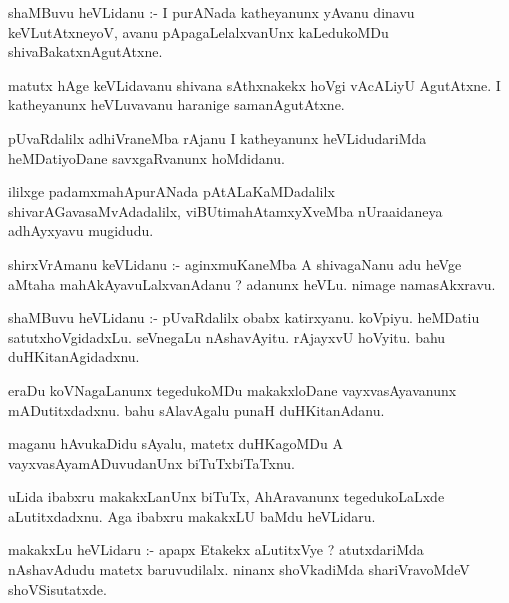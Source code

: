 \documentclass{article}
\begin{document}
\begin{mn}
shaMBuvu  heVLidanu :- I  purANada  katheyanunx  yAvanu  dinavu  keVLutAtxneyoV,  avanu  pApagaLelalxvanUnx  
kaLedukoMDu  shivaBakatxnAgutAtxne.
\end{mn}

\begin{mn}
matutx  hAge  keVLidavanu  shivana  sAthxnakekx  hoVgi  vAcALiyU  AgutAtxne.  I  katheyanunx  heVLuvavanu  
haranige  samanAgutAtxne.
\end{mn}

\begin{mn}
pUvaRdalilx  adhiVraneMba  rAjanu  I  katheyanunx  heVLidudariMda  heMDatiyoDane  savxgaRvanunx  hoMdidanu.
\end{mn}

\begin{mn}
ililxge  padamxmahApurANada  pAtALaKaMDadalilx  shivarAGavasaMvAdadalilx,  viBUtimahAtamxyXveMba  
nUraaidaneya  adhAyxyavu  mugidudu.
\end{mn}




\begin{mn}
shirxVrAmanu  keVLidanu :- aginxmuKaneMba  A  shivagaNanu  adu  heVge  aMtaha  mahAkAyavuLalxvanAdanu ?  
adanunx  heVLu.  nimage  namasAkxravu.
\end{mn}

\begin{mn}
shaMBuvu  heVLidanu :- pUvaRdalilx  obabx  katirxyanu.  koVpiyu.  heMDatiu  satutxhoVgidadxLu.  seVnegaLu  
nAshavAyitu.  rAjayxvU  hoVyitu.  bahu  duHKitanAgidadxnu.
\end{mn}

\begin{mn}
eraDu  koVNagaLanunx  tegedukoMDu  makakxloDane  vayxvasAyavanunx  mADutitxdadxnu.  bahu  sAlavAgalu  punaH  duHKitanAdanu.
\end{mn}

\begin{mn}
maganu  hAvukaDidu  sAyalu,  matetx  duHKagoMDu  A  vayxvasAyamADuvudanUnx  biTuTxbiTaTxnu.
\end{mn}

\begin{mn}
uLida  ibabxru  makakxLanUnx  biTuTx,  AhAravanunx  tegedukoLaLxde  aLutitxdadxnu.  Aga  ibabxru  
makakxLU  baMdu  heVLidaru.
\end{mn}

\begin{mn}
makakxLu  heVLidaru :- apapx  Etakekx  aLutitxVye ?  atutxdariMda  nAshavAdudu  matetx  baruvudilalx.  
ninanx  shoVkadiMda  shariVravoMdeV  shoVSisutatxde.
\end{mn}
\end{document}
